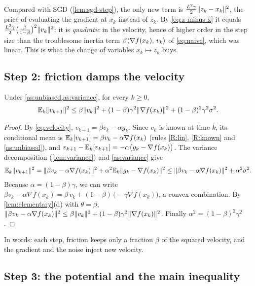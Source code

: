 Compared with SGD (\cref{lem:sgd-step}), the only new term is
$\frac{L^2\gamma}{2}\lVert z_k-x_k\rVert^2$, the price of evaluating the gradient at $x_k$
instead of $z_k$. By \eqref{eq:z-minus-x} it equals
$\frac{L^2\gamma}{2}\bigl(\frac{\beta}{1-\beta}\bigr)^2\lVert v_k\rVert^2$: it is
\emph{quadratic} in the velocity, hence of higher order in the step size than the
troublesome inertia term $\beta\langle \nabla f(x_k),\, v_k\rangle$ of \eqref{eq:naive}, which was
linear. This is what the change of variables $x_k\mapsto z_k$ buys.

\subsection{Step 2: friction damps the velocity}

\begin{lemma}\label{lem:velocity}
Under \cref{as:unbiased,as:variance}, for every $k\ge0$,
\begin{equation}\label{eq:velocity-bound}
  \mathbb{E}_k\lVert v_{k+1}\rVert^2\le\beta\lVert v_k\rVert^2+(1-\beta)\gamma^2\lVert \nabla f(x_k)\rVert^2+(1-\beta)^2\gamma^2\sigma^2 .
\end{equation}
\end{lemma}

\begin{proof}
By \eqref{eq:velocity}, $v_{k+1}=\beta v_k-\alpha g_k$. Since $v_k$ is known at time $k$,
its conditional mean is $\mathbb{E}_k[v_{k+1}]=\beta v_k-\alpha\nabla f(x_k)$ (rules \ref{R:lin},
\ref{R:known} and \cref{as:unbiased}), and $v_{k+1}-\mathbb{E}_k[v_{k+1}]=-\alpha\bigl(g_k-\nabla f(x_k)\bigr)$.
The variance decomposition (\cref{lem:variance}) and \cref{as:variance} give
\[
  \mathbb{E}_k\lVert v_{k+1}\rVert^2=\lVert \beta v_k-\alpha\nabla f(x_k)\rVert^2+\alpha^2\mathbb{E}_k\lVert g_k-\nabla f(x_k)\rVert^2
  \le\lVert \beta v_k-\alpha\nabla f(x_k)\rVert^2+\alpha^2\sigma^2 .
\]
Because $\alpha=(1-\beta)\gamma$, we can write
$\beta v_k-\alpha\nabla f(x_k)=\beta\,v_k+(1-\beta)\,\bigl(-\gamma\nabla f(x_k)\bigr)$, a convex
combination. By \cref{lem:elementary}(d) with $\theta=\beta$,
$\lVert \beta v_k-\alpha\nabla f(x_k)\rVert^2\le\beta\lVert v_k\rVert^2+(1-\beta)\gamma^2\lVert \nabla f(x_k)\rVert^2$.
Finally $\alpha^2=(1-\beta)^2\gamma^2$.
\end{proof}

In words: each step, friction keeps only a fraction $\beta$ of the squared velocity, and the
gradient and the noise inject new velocity.

\subsection{Step 3: the potential and the main inequality}

